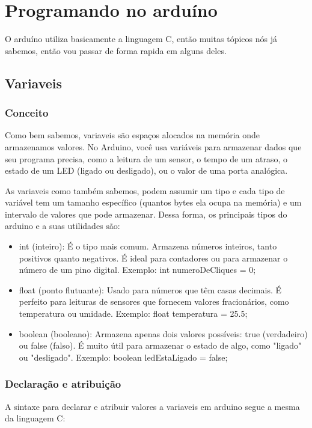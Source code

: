 \documentclass{report}
\begin{document}
	\section{Programando no arduíno}
	O arduíno utiliza basicamente a linguagem C, então muitas tópicos nós já sabemos, então vou passar de forma rapida em alguns deles.
	\subsection{Variaveis}
	\subsubsection{Conceito}
	Como bem sabemos, variaveis são espaços alocados na memória onde armazenamos valores. No Arduino, você usa variáveis para armazenar dados que seu programa precisa, como a leitura de um sensor, o tempo de um atraso, o estado de um LED (ligado ou desligado), ou o valor de uma porta analógica.
	
	As variaveis como também sabemos, podem assumir um tipo e cada tipo de variável tem um tamanho específico (quantos bytes ela ocupa na memória) e um intervalo de valores que pode armazenar. Dessa forma, os principais tipos do arduino e a suas utilidades são:
	
	\begin{itemize}
		\item int (inteiro): É o tipo mais comum. Armazena números inteiros, tanto positivos quanto negativos. É ideal para contadores ou para armazenar o número de um pino digital. Exemplo: int numeroDeCliques = 0;
		\item float (ponto flutuante): Usado para números que têm casas decimais. É perfeito para leituras de sensores que fornecem valores fracionários, como temperatura ou umidade. Exemplo: float temperatura = 25.5;
		\item boolean (booleano): Armazena apenas dois valores possíveis: true (verdadeiro) ou false (falso). É muito útil para armazenar o estado de algo, como "ligado" ou "desligado". Exemplo: boolean ledEstaLigado = false;
		
		
		
	\end{itemize}
	\subsubsection{Declaração e atribuição}
	
	A sintaxe para declarar e atribuir valores a variaveis em arduino segue a mesma da linguagem C:
	
\end{document}
